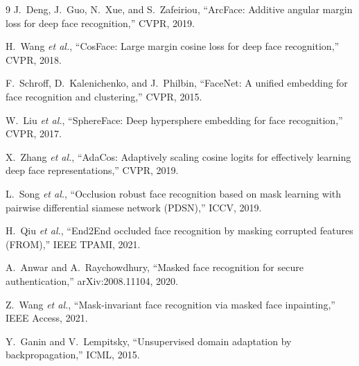 \documentclass[10pt,conference]{IEEEtran}
\begin{document}

\begin{thebibliography}{9}
J.~Deng, J.~Guo, N.~Xue, and S.~Zafeiriou,
``ArcFace: Additive angular margin loss for deep face recognition,'' CVPR, 2019.

H.~Wang \emph{et al.},
``CosFace: Large margin cosine loss for deep face recognition,'' CVPR, 2018.

F.~Schroff, D.~Kalenichenko, and J.~Philbin,
``FaceNet: A unified embedding for face recognition and clustering,'' CVPR, 2015.

W.~Liu \emph{et al.},
``SphereFace: Deep hypersphere embedding for face recognition,'' CVPR, 2017.

X.~Zhang \emph{et al.},
``AdaCos: Adaptively scaling cosine logits for effectively learning deep
face representations,'' CVPR, 2019.

L.~Song \emph{et al.},
``Occlusion robust face recognition based on mask learning with pairwise
differential siamese network (PDSN),'' ICCV, 2019.

H.~Qiu \emph{et al.},
``End2End occluded face recognition by masking corrupted features (FROM),''
IEEE TPAMI, 2021.

A.~Anwar and A.~Raychowdhury,
``Masked face recognition for secure authentication,'' arXiv:2008.11104, 2020.

Z.~Wang \emph{et al.},
``Mask-invariant face recognition via masked face inpainting,''
IEEE Access, 2021.

Y.~Ganin and V.~Lempitsky,
``Unsupervised domain adaptation by backpropagation,'' ICML, 2015.
\end{thebibliography}
\end{document}
